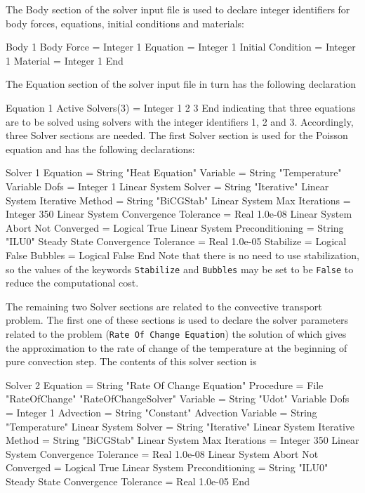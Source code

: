 The Body section of the solver input file is used to declare integer 
identifiers for body forces, equations, initial conditions and materials: 

\ttbegin
Body 1
  Body Force = Integer 1
  Equation = Integer 1
  Initial Condition = Integer 1
  Material = Integer 1
End
\ttend

The Equation section of the solver input file in turn has the following 
declaration

\ttbegin
Equation 1
  Active Solvers(3) = Integer 1 2 3
End
\ttend
indicating that three equations are to be solved using solvers with 
the integer identifiers 1, 2 and 3.   
Accordingly, three Solver sections are needed.  
The first Solver section is used for the Poisson equation and has the 
following declarations:

\ttbegin
Solver 1
  Equation = String "Heat Equation"
  Variable = String "Temperature"
  Variable Dofs = Integer 1
  Linear System Solver = String "Iterative"
  Linear System Iterative Method = String "BiCGStab"
  Linear System Max Iterations = Integer 350
  Linear System Convergence Tolerance = Real 1.0e-08
  Linear System Abort Not Converged = Logical True
  Linear System Preconditioning = String "ILU0"
  Steady State Convergence Tolerance = Real 1.0e-05
  Stabilize = Logical False
  Bubbles = Logical False
End
\ttend
Note that there is no need to use stabilization, so the values of the keywords 
{\tt Stabilize} and {\tt Bubbles} may be set to be {\tt False} to reduce the
computational cost. 

The remaining two Solver sections are related to the convective transport
problem. The first one of these sections is used to declare the solver
parameters related to the problem ({\tt Rate Of Change Equation}) the 
solution of which gives the approximation to the rate of change of the 
temperature at the beginning of pure convection step. The contents
of this solver section is 

\ttbegin
Solver 2
  Equation = String "Rate Of Change Equation"
  Procedure = File "RateOfChange" "RateOfChangeSolver"
  Variable = String "Udot"
  Variable Dofs = Integer 1   
  Advection = String "Constant"
  Advection Variable = String "Temperature" 
  Linear System Solver = String "Iterative"
  Linear System Iterative Method = String "BiCGStab"
  Linear System Max Iterations = Integer 350
  Linear System Convergence Tolerance = Real 1.0e-08
  Linear System Abort Not Converged = Logical True
  Linear System Preconditioning = String "ILU0"
  Steady State Convergence Tolerance = Real 1.0e-05
End
\ttend


